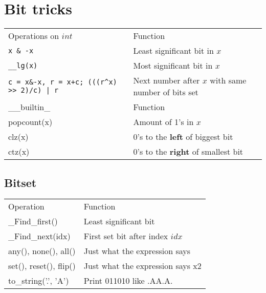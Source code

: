 \section{Bit tricks}
\vspace{-5pt}

\begin{tabular}{ |p{3cm}|p{5cm}|  }
  \hline  
  \rowcolor{Azul} 
  \multicolumn{2}{|c|}{Bits++} \\
  \hline
  \rowcolor{AzulClaro2} 
  Operations on $int$ & Function \\
  \hline
  \texttt{x \& -x} & Least significant bit in $x$ \\
  \rowcolor{Gris} 
  \texttt{\_\_lg(x)} & Most significant bit in $x$ \\
  \texttt{c = x\&-x, r = x+c; (((r\^{}x) >> 2)/c) | r} & Next number after $x$ with same number of bits set \\
  \hline

  \rowcolor{AzulClaro2} 
  \_\_builtin\_ & Function \\
  \hline 
  popcount(x) & Amount of 1's in $x$ \\
  \rowcolor{Gris} 
  clz(x) & 0's to the \textbf{left} of biggest bit \\
  ctz(x) & 0's to the \textbf{right} of smallest bit \\
  \hline
\end{tabular}

\subsection{Bitset} 
\vspace{-5pt}

\begin{tabular}{ |p{3cm}|p{5cm}|  }
  \hline 
  \rowcolor{Azul} 
  \multicolumn{2}{|c|}{Bitset<Size>} \\
  \hline
  \rowcolor{AzulClaro2} 
  Operation & Function \\
  \hline
  \_Find\_first() & Least significant bit \\
  \rowcolor{Gris} 
  \_Find\_next(idx) & First set bit after index $idx$ \\
  any(), none(), all() & Just what the expression says \\
  \rowcolor{Gris} 
  set(), reset(), flip() & Just what the expression says x2 \\
  to\_string('.', 'A') & Print 011010 like .AA.A. \\
  \hline
\end{tabular}

% 

